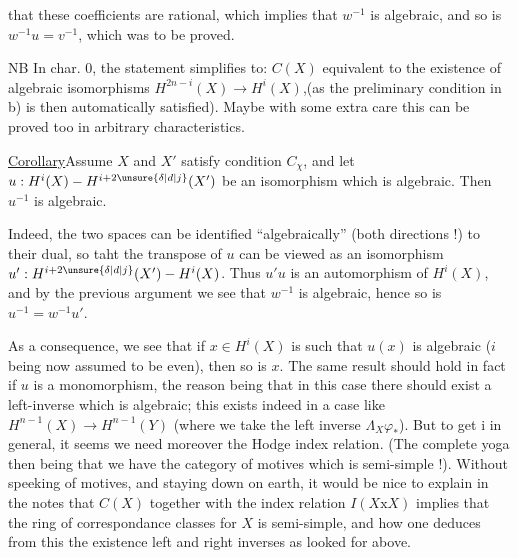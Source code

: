 
that these coefficients are rational, which implies that $w^{-1}$ is algebraic, and so is $w^{-1}u=v^{-1}$, which was to be proved.

NB In char. 0,  the statement simplifies to: $C(X)$ equivalent to the existence of algebraic isomorphisms $H^{2n-i}(X)\to H^i(X)$,(as the preliminary condition in b) is then automatically satisfied). Maybe with some extra care this can be proved too in arbitrary characteristics.

\uline{Corollary}\quad Assume $X$ and $X'$ satisfy condition $C_{\chi}$, and let $u:H^i(X)\mathbin{-}H^{i+2\unsure{\delta|d|j}}(X')$  be an isomorphism which is algebraic. Then $u^{-1}$ is algebraic.

Indeed, the two spaces can be identified ``algebraically'' (both directions !) to their dual, so taht the transpose of $u$ can be viewed as an isomorphism $u':H^{i+2\unsure{\delta|d|j}}(X')\mathbin{-}H^i(X)$. Thus $u'u$ is an  automorphism  of $H^i(X)$, and by the previous argument we see that $w^{-1}$ is algebraic, hence so is $u^{-1}=w^{-1}u'$.

As a consequence, we see that if $x\in H^i(X)$ is such that $u(x)$ is algebraic ($i$ being now assumed to be even), then so is $x$. The same result should hold in fact if $u$ is a monomorphism, the reason being that in this case there should exist a left-inverse which is algebraic; this exists indeed in a case like $H^{n-1}(X)\to H^{n-1}(Y)$ (where we take the left inverse $\Lambda_X\varphi_*$). But to get i in general, it seems we need moreover the Hodge index relation. (The complete yoga then being that we have the category of motives which is semi-simple !). Without speeking of motives, and staying down on earth, it would be nice to explain in the notes that $C(X)$ together with the index relation $I(X\mathrm{x}X)$ implies that the ring of correspondance classes for $X$ is semi-simple, and how one deduces from this the existence  left and right inverses as looked for above.

